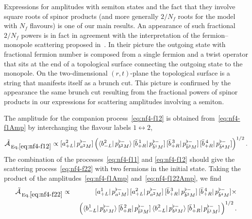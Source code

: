 \documentclass[a4paper,11pt]{article}
\begin{document}
\medskip

Expressions for amplitudes with semiton states and the fact that they involve square roots of spinor products (and more generally $2/N_f$ roots for the model with $N_f$ flavours) is one of our main results. An appearance of such fractional $2/N_f$ powers is in fact in agreement with the interpretation of the fermion--monopole scattering 
proposed in~\cite{vanBeest:2023dbu}.
In their picture the outgoing state with fractional fermion number is composed from a single fermion and a twist operator that sits at the end of a topological surface connecting the outgoing state to the monopole. On the two-dimensional $(r,t)$-plane the topological surface is a string that manifests itself as a brunch cut. This picture is confirmed by the appearance the same brunch cut resulting from the fractional powers of spinor products in our expressions for scattering amplitudes involving a semiton.

\medskip


The amplitude for the companion process~\eqref{eq:nf4-f12} is obtained from~\eqref{eq:nf4-f1Amp} by interchanging the flavour labels $1 \leftrightarrow 2$,
\begin{equation}
\label{eq:nf4-f122Amp}
 \tilde{\cal A}_{\, \rm Eq.\eqref{eq:nf4-f12}} \propto
  [a_{+L}^2 | \, p^{\flat -}_{a^2 M} ]\left(\langle b_{-L}^2 | \,p^{\flat -}_{b^2 M} \rangle\,
  [\bar{b}_{+R}^{\,1} | \, p^{\flat -}_{\bar{b}^1 M} ]\,
   [\bar{b}_{+R}^{\,3} | \, p^{\flat -}_{\bar{b}^3 M} ]\,
    [\bar{b}_{+R}^{\,4} | \, p^{\flat -}_{\bar{b}^4 M} ]
  \right)^{1/2}.
\end{equation} 
The combination of the processes~\eqref{eq:nf4-f11} and \eqref{eq:nf4-f12} should give the scattering process~\eqref{eq:nf4-f22} 
with two fermions in the initial state.
Taking the product of the amplitudes~\eqref{eq:nf4-f1Amp} and~\eqref{eq:nf4-f122Amp}, we find
\begin{eqnarray}
 \tilde{\cal A}_{\, \rm Eq.\eqref{eq:nf4-f22}} \propto &&
 [a_{+L}^1 | \, p^{\flat -}_{a^1 M} ]\,  [a_{+L}^2 | \, p^{\flat -}_{a^2 M} ]\,
 [\bar{b}_{+R}^{\,3} | \, p^{\flat -}_{\bar{b}^3 M} ]\,
    [\bar{b}_{+R}^{\,4} | \, p^{\flat -}_{\bar{b}^4 M} ] \times \nonumber\\
\label{eq:Amp2fbbar}    
&& \,\,\left(
 \langle b_{-L}^1 | \,p^{\flat -}_{b^1 M} \rangle\,
  [\bar{b}_{+R}^{\,2} | \, p^{\flat -}_{\bar{b}^2 M} ]\,
  \langle b_{-L}^2 | \,p^{\flat -}_{b^2 M} \rangle\,
  [\bar{b}_{+R}^{\,1} | \, p^{\flat -}_{\bar{b}^1 M} ]\,
     \right)^{1/2}.
\end{eqnarray} 
\end{document}
